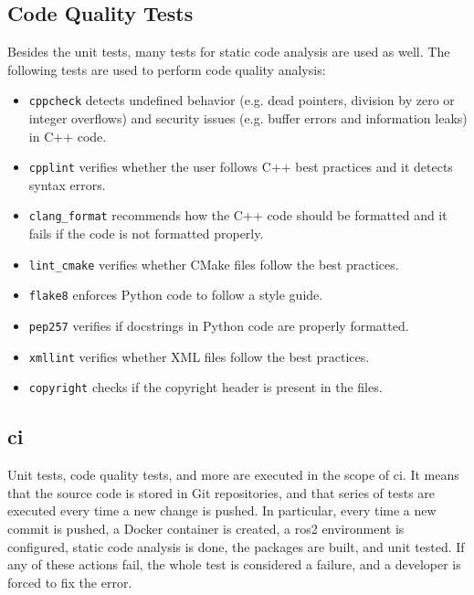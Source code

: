 \subsection{Code Quality Tests}
Besides the unit tests, many tests for static code analysis are used as well.
The following tests are used to perform code quality analysis:
\begin{itemize}
    \item \texttt{cppcheck} detects undefined behavior (e.g. dead pointers, division by zero or integer overflows) and security issues (e.g. buffer errors and information leaks) in C++ code.
    \item \texttt{cpplint} verifies whether the user follows C++ best practices and it detects syntax errors.
    \item \texttt{clang\_format} recommends how the C++ code should be formatted and it fails if the code is not formatted properly. 
    \item \texttt{lint\_cmake} verifies whether CMake files follow the best practices.
    \item \texttt{flake8} enforces Python code to follow a style guide.
    \item \texttt{pep257} verifies if docstrings in Python code are properly formatted.
    \item \texttt{xmllint} verifies whether XML files follow the best practices.
    \item \texttt{copyright} checks if the copyright header is present in the files.
\end{itemize}

\subsection{\acl{ci}}
Unit tests, code quality tests, and more are executed in the scope of \ac{ci}.
It means that the source code is stored in Git repositories, and that series of tests are executed every time a new change is pushed.
In particular, every time a new commit is pushed, a Docker container is created, a \ac{ros2} environment is configured, static code analysis is done, the packages are built, and unit tested.
If any of these actions fail, the whole test is considered a failure, and a developer is forced to fix the error.
